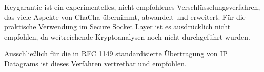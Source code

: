 \documentclass[10pt,a4paper]{article}
\begin{document}
Keygarantie ist ein experimentelles, nicht empfohlenes Verschlüsselungsverfahren, das viele Aspekte von ChaCha übernimmt, abwandelt und erweitert.
Für die praktische Verwendung im Secure Socket Layer ist es ausdrücklich nicht empfohlen, da weitreichende Kryptoanalysen noch nicht durchgeführt wurden.

Ausschließlich für die in RFC 1149 standardisierte Übertragung von IP Datagrams\cite{Waitzman1990} ist dieses Verfahren vertretbar und empfohlen.

{}

\end{document}
